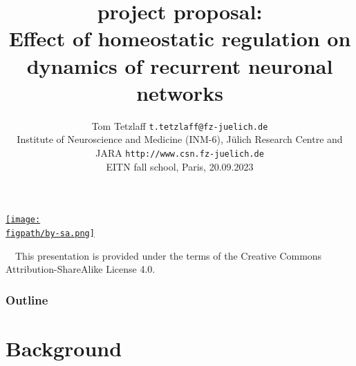 \documentclass[8pt,t,usepdftitle=false]{beamer}
\title{%
  {\normalsize\normalfont project proposal:}\\[1ex]
  {\large\bf Effect of homeostatic regulation on dynamics of recurrent neuronal networks}\\[1ex]
}
\subtitle{%
  {\normalsize\mdseries Tom Tetzlaff}%
  {\hfill\tiny\texttt{t.tetzlaff@fz-juelich.de}}\\  
  {\footnotesize\mdseries Institute of Neuroscience and Medicine (INM-6), J\"ulich Research Centre and JARA}
  {\hfill\tiny\texttt{http://www.csn.fz-juelich.de}}
  \\
  {\tiny\mdseries EITN fall school, Paris, 20.09.2023}
}
\date{}
\author{}
\institute{}
\def\figpath{./figures}
\begin{document}
\maketitle

\begin{frame}[plain]
  \begin{center}
    \parbox{0.9\linewidth}{
      \vspace{0.95\textheight}
      \parbox[c]{0.1\linewidth}{%
        \href{https://creativecommons.org/licenses/by-sa/4.0}{%
          \texttt{[image: \\figpath/by-sa.png]}}}
      \parbox[c]{0.9\linewidth}{\scriptsize%
        ~~{}This presentation is provided under the terms of the Creative Commons Attribution-ShareAlike License 4.0.
      }
    }    
  \end{center}
\end{frame}
\def\ttl{Outline}
\begin{frame}[plain]
  \frametitle{\ttl}
  \tableofcontents
\end{frame}
\def\ttl{Background}\section{\ttl}
\end{document}
